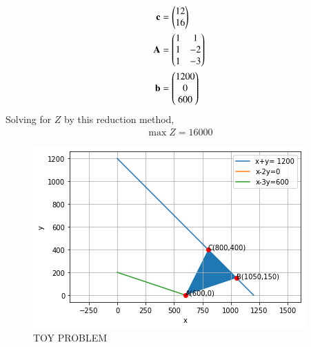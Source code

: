 \documentclass[journal,12pt,twocolumn]{IEEEtran}
\begin{document}
\begin{align}
    \mathbf{c} &= \begin{pmatrix}12\\16\end{pmatrix}\\
    \mathbf{A} &= \begin{pmatrix}1 & 1\\ 1 & -2\\1 & -3\end{pmatrix}\\
    \mathbf{b} &= \begin{pmatrix}1200 \\ 0 \\ 600\end{pmatrix}
\end{align}
Solving for $Z$ by this reduction method,
\begin{align}
    \max Z = 16000
\end{align}
\begin{figure}[H]
\centering
\includegraphics[width=\columnwidth]{FIG12.png}
\caption{TOY PROBLEM}
\label{fig:TOY PROBLEM}	
\end{figure}
\end{document}
